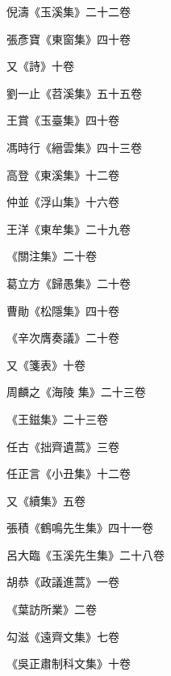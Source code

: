 \begin{pinyinscope}
 倪濤《玉溪集》二十二卷



 張彥寶《東窗集》四十卷



 又《詩》十卷



 劉一止《苕溪集》五十五卷



 王賞《玉臺集》四十卷



 馮時行《縉雲集》四十三卷



 高登《東溪集》十二卷



 仲並《浮山集》十六卷



 王洋《東牟集》二十九卷



 《關注集》二十卷



 葛立方《歸愚集》二十卷



 曹勛《松隱集》四十卷



 《辛次膺奏議》二十卷



 又《箋表》十卷



 周麟之《海陵
 集》二十三卷



 《王鎡集》二十三卷



 任古《拙齊遺蒿》三卷



 任正言《小丑集》十二卷



 又《續集》五卷



 張積《鶴鳴先生集》四十一卷



 呂大臨《玉溪先生集》二十八卷



 胡恭《政議進蒿》一卷



 《葉訪所業》二卷



 勾滋《遠齊文集》七卷



 《吳正肅制科文集》十卷




\end{pinyinscope}
